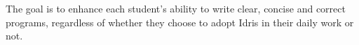 The goal is to enhance each student's ability to write clear, concise
and correct programs, regardless of whether they choose to adopt Idris
in their daily work or not.
